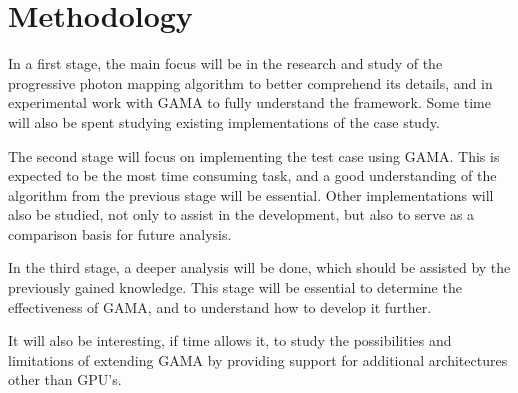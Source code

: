 \section{Methodology}

In a first stage, the main focus will be in the research and study of the progressive photon mapping algorithm to better comprehend its details, and in experimental work with GAMA to fully understand the framework. Some time will also be spent studying existing implementations of the case study.

The second stage will focus on implementing the test case using GAMA. This is expected to be the most time consuming task, and a good understanding of the algorithm from the previous stage will be essential.  Other implementations will also be studied, not only to assist in the development, but also to serve as a comparison basis for future analysis.

  In the third stage, a deeper analysis will be done, which should be assisted by the previously gained knowledge. This stage will be essential to determine the effectiveness of GAMA, and to understand how to develop it further.

It will also be interesting, if time allows it, to study the possibilities and limitations of extending GAMA by providing support for additional architectures other than GPU's.
